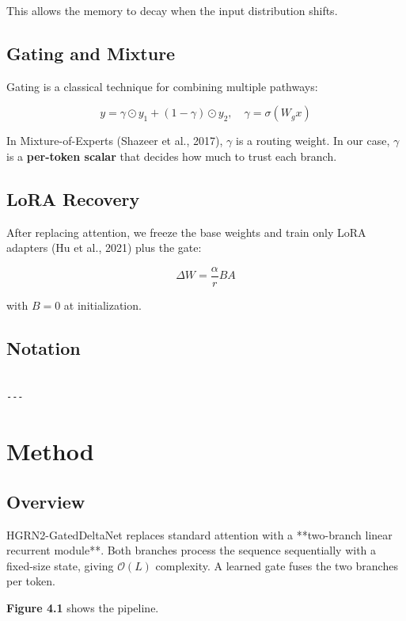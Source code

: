 This allows the memory to decay when the input distribution shifts.

\subsection{Gating and Mixture}

Gating is a classical technique for combining multiple pathways:

\[
y = \gamma \odot y_1 + (1 - \gamma) \odot y_2, \quad
\gamma = \sigma(W_g x)
\tag{3.5}
\]

In Mixture-of-Experts (Shazeer et al., 2017), $\gamma$ is a routing weight. 
In our case, $\gamma$ is a \textbf{per-token scalar} that decides how much to 
trust each branch.

\subsection{LoRA Recovery}

After replacing attention, we freeze the base weights and train only LoRA 
adapters (Hu et al., 2021) plus the gate:

\[
\Delta W = \frac{\alpha}{r} B A
\tag{3.6}
\]

with $B = 0$ at initialization.

\subsection{Notation}

\begin{lstlisting}

---
\end{lstlisting}

\section{Method}

\subsection{Overview}

HGRN2-GatedDeltaNet replaces standard attention with a **two-branch linear 
recurrent module**. Both branches process the sequence sequentially with a 
fixed-size state, giving $\mathcal{O}(L)$ complexity. A learned gate fuses 
the two branches per token.

\textbf{Figure 4.1} shows the pipeline.

